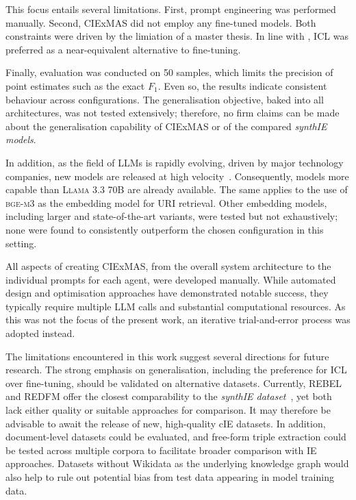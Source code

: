 \documentclass[a4paper,oneside,bibliography=totoc]{scrbook}
\begin{document}
This focus entails several limitations. First, prompt engineering was performed manually. Second, CIExMAS did not employ any fine-tuned models. Both constraints were driven by the limiation of a master thesis. In line with \citet{Brown2020}, \ac{ICL} was preferred as a near-equivalent alternative to fine-tuning.

Finally, evaluation was conducted on 50 samples, which limits the precision of point estimates such as the exact $F_{1}$. Even so, the results indicate consistent behaviour across configurations. The generalisation objective, baked into all architectures, was not tested extensively; therefore, no firm claims can be made about the generalisation capability of CIExMAS or of the compared \textit{synthIE models}.

In addition, as the field of \acp{LLM} is rapidly evolving, driven by major technology companies, new models are released at high velocity~\cite{Brown2020,Grattafiori2024,MetaAI2025,Chiang2024}. Consequently, models more capable than \textsc{Llama 3.3 70B} are already available. The same applies to the use of \textsc{bge-m3} as the embedding model for \ac{URI} retrieval. Other embedding models, including larger and state-of-the-art variants, were tested but not exhaustively; none were found to consistently outperform the chosen configuration in this setting.

All aspects of creating CIExMAS, from the overall system architecture to the individual prompts for each agent, were developed manually. While automated design and optimisation approaches have demonstrated notable success, they typically require multiple \ac{LLM} calls and substantial computational resources. As this was not the focus of the present work, an iterative trial-and-error process was adopted instead.

The limitations encountered in this work suggest several directions for future research. The strong emphasis on generalisation, including the preference for \ac{ICL} over fine-tuning, should be validated on alternative datasets. Currently, REBEL and REDFM offer the closest comparability to the \textit{synthIE dataset}~\cite{HuguetCabot2021,Cabot2023}, yet both lack either quality or suitable approaches for comparison. It may therefore be advisable to await the release of new, high-quality \ac{cIE} datasets. In addition, document-level datasets could be evaluated, and free-form triple extraction could be tested across multiple corpora to facilitate broader comparison with \ac{IE} approaches. Datasets without Wikidata as the underlying knowledge graph would also help to rule out potential bias from test data appearing in model training data.
\end{document}
